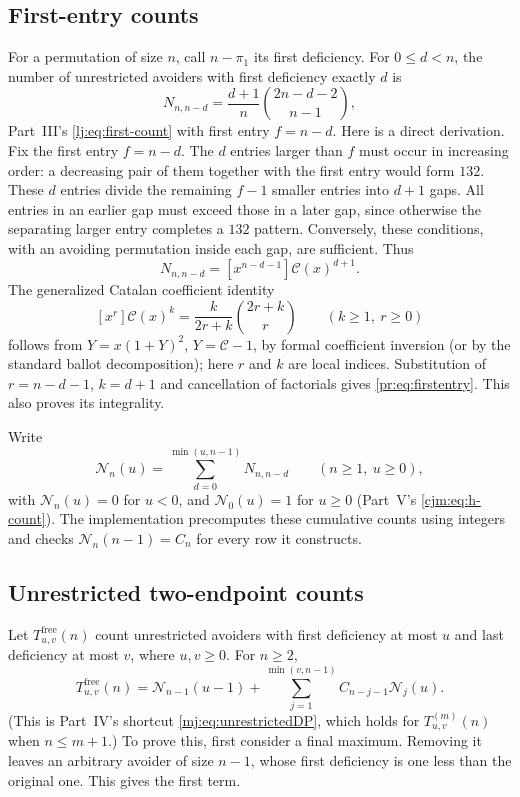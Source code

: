 \documentclass[11pt,a4paper]{article}
\theoremstyle{definition}\newaliascnt{definition}{theorem}
\theoremstyle{remark}\newaliascnt{remark}{theorem}
\newcommand{\Cat}{\mathcal C}
\begin{document}
\subsection{First-entry counts}
For a permutation of size $n$, call $n-\pi_1$ its first deficiency. For
$0\le d<n$, the number of unrestricted avoiders with first deficiency exactly
$d$ is
\begin{equation}
 N_{n,n-d}=\frac{d+1}{n}\binom{2n-d-2}{n-1},
 \label{pr:eq:firstentry}
\end{equation}
Part~III's \eqref{lj:eq:first-count} with first entry $f=n-d$. Here is a
direct derivation. Fix the first entry $f=n-d$. The $d$ entries larger than
$f$ must occur in increasing order: a decreasing pair of them together with
the first entry would form $132$. These $d$ entries divide the remaining
$f-1$ smaller entries into $d+1$ gaps. All entries in an earlier gap must
exceed those in a later gap, since otherwise the separating larger entry
completes a $132$ pattern. Conversely, these conditions, with an avoiding
permutation inside each gap, are sufficient. Thus
\[
 N_{n,n-d}=[x^{n-d-1}]\Cat(x)^{d+1}.
\]
The generalized Catalan coefficient identity
\[
 [x^r]\Cat(x)^k=\frac{k}{2r+k}\binom{2r+k}{r}
 \qquad(k\ge1,\ r\ge0)
\]
follows from $Y=x(1+Y)^2$, $Y=\Cat-1$, by formal coefficient inversion (or by
the standard ballot decomposition); here $r$ and $k$ are local indices.
Substitution of $r=n-d-1$, $k=d+1$ and cancellation of factorials gives
\eqref{pr:eq:firstentry}. This also proves its integrality.

Write
\begin{equation}
 \mathcal N_n(u)=\sum_{d=0}^{\min(u,n-1)} N_{n,n-d}\qquad(n\ge1,\ u\ge0),
 \label{pr:eq:hdef}
\end{equation}
with $\mathcal N_n(u)=0$ for $u<0$, and $\mathcal N_0(u)=1$ for $u\ge0$ (Part~V's
\eqref{cjm:eq:h-count}). The implementation precomputes these cumulative
counts using integers and checks $\mathcal N_n(n-1)=C_n$ for every row it
constructs.

\subsection{Unrestricted two-endpoint counts}
Let $T^{\mathrm{free}}_{u,v}(n)$ count unrestricted avoiders with first
deficiency at most $u$ and last deficiency at most $v$, where $u,v\ge0$. For
$n\ge2$,
\begin{equation}
 T^{\mathrm{free}}_{u,v}(n)=\mathcal N_{n-1}(u-1)
 +\sum_{j=1}^{\min(v,n-1)}C_{n-j-1}\mathcal N_j(u).
 \label{pr:eq:freeendpoints}
\end{equation}
(This is Part~IV's shortcut \eqref{mj:eq:unrestrictedDP}, which holds for
$T^{(m)}_{u,v}(n)$ when $n\le m+1$.) To prove this, first consider a final
maximum. Removing it leaves an arbitrary avoider of size $n-1$, whose first
deficiency is one less than the original one. This gives the first term.
\end{document}
